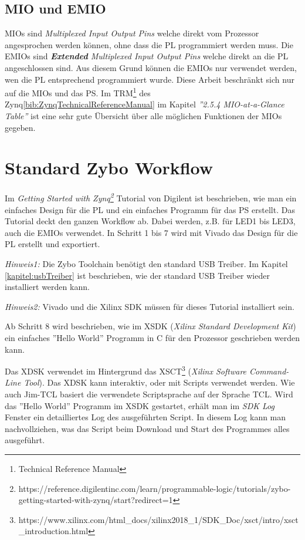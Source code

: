 \subsection{MIO und EMIO}
MIOs sind \textit{Multiplexed Input Output Pins} welche direkt vom Prozessor angesprochen werden können, ohne dass die PL programmiert werden muss.
Die EMIOs sind \textit{\textbf{Extended} Multiplexed Input Output Pins} welche direkt an die PL angeschlossen sind.
Aus diesem Grund können die EMIOs nur verwendet werden, wen die PL entsprechend programmiert wurde.
Diese Arbeit beschränkt sich nur auf die MIOs und das PS.
Im TRM\footnote{Technical Reference Manual} des Zynq\ref{bib:ZynqTechnicalReferenceManual} im Kapitel \textit{''2.5.4 MIO-at-a-Glance Table''} ist eine sehr gute Übersicht über alle möglichen Funktionen der MIOs gegeben.



\section{Standard Zybo Workflow}
Im \textit{Getting Started with Zynq\footnote{https://reference.digilentinc.com/learn/programmable-logic/tutorials/zybo-getting-started-with-zynq/start?redirect=1}} Tutorial von Digilent ist beschrieben, wie man ein einfaches Design für die PL und ein einfaches Programm für das PS erstellt.
Das Tutorial deckt den ganzen Workflow ab.
Dabei werden, z.B. für LED1 bis LED3, auch die EMIOs verwendet.
In Schritt 1 bis 7 wird mit Vivado das Design für die PL erstellt und exportiert.

\textit{Hinweis1:} Die Zybo Toolchain benötigt den standard USB Treiber. Im Kapitel \ref{kapitel:usbTreiber} ist beschrieben, wie der standard USB Treiber wieder installiert werden kann.

\textit{Hinweis2:} Vivado und die Xilinx SDK müssen für dieses Tutorial installiert sein.

Ab Schritt 8 wird beschrieben, wie im XSDK (\textit{Xilinx Standard Development Kit}) ein einfaches ''Hello World'' Programm in C für den Prozessor geschrieben werden kann.

Das XDSK verwendet im Hintergrund das XSCT\footnote{https://www.xilinx.com/html\_docs/xilinx2018\_1/SDK\_Doc/xsct/intro/xsct\_introduction.html} (\textit{Xilinx Software Command-Line Tool}).
Das XDSK kann interaktiv, oder mit Scripts verwendet werden.
Wie auch Jim-TCL basiert die verwendete Scriptsprache auf der Sprache TCL.
Wird das ''Hello World'' Programm im XSDK gestartet, erhält man im \textit{SDK Log} Fenster ein detailliertes Log des ausgeführten Script.
In diesem Log kann man nachvollziehen, was das Script beim Download und Start des Programmes alles ausgeführt.

